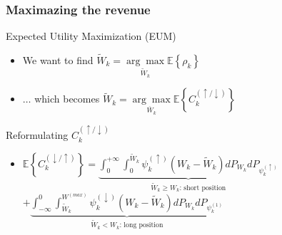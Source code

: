 \begin{frame}\frametitle{Maximazing the revenue}
  \begin{block}{Expected Utility Maximization (EUM)}

  \begin{itemize}
    \item We want to find $\widetilde { W } _ { k } = \underset { \widetilde { W } _ { k } } { \arg \max } \mathbb { E } \left\{ \rho _ { k } \right\}$
   \item $\ldots$ which becomes $\widetilde { W } _ { k } = \underset { \overline { W } _ { k } } { \arg \max } \mathbb { E } \left\{ C _ { k } ^ { ( \uparrow / \downarrow ) } \right\}$
  \end{itemize}
\end{block}

\begin{block}{Reformulating $C _ { k } ^ { ( \uparrow / \downarrow ) }$}

  \begin{itemize}
    \item
$
  \mathbb { E } \left\{ C _ { k } ^ { ( \downarrow / \uparrow ) } \right\} = \underbrace{\int _ { 0 } ^ { + \infty } \int _ { 0 } ^ { \widetilde { W } _ { k } } \psi _ { k } ^ { ( \uparrow ) } \left( W _ { k } - \widetilde { W } _ { k } \right) d P _ { W _ { k } } d P _ { \psi _ { k } ^ { ( \uparrow ) } }}_{\widetilde { W } _ { k }\geq W_k \text{: short position}}$ $
+ \underbrace{\int _ { - \infty } ^ { 0 } \int _ { \widetilde { W } _ { k } } ^ { W ^ { ( m a x ) } } \psi _ { k } ^ { ( \downarrow ) } \left( W _ { k } - \widetilde { W } _ { k } \right) d P _ { W _ { k } } d P _ { \psi _ { k } ^ { ( 1 ) } }}_{\widetilde { W } _ { k }< W_k \text{: long position}}
$
  \end{itemize}
\end{block}
\end{frame}



